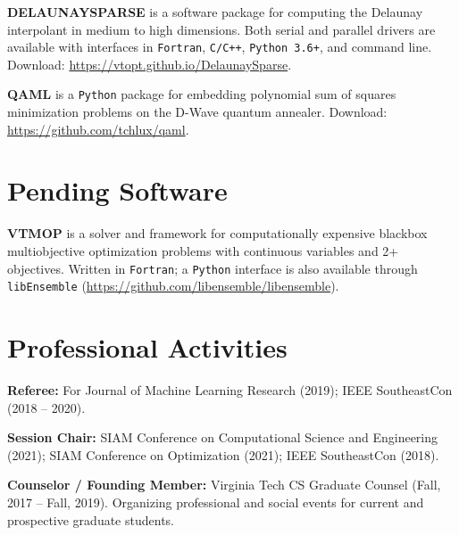 \documentclass[11pt]{article}
\begin{document}
\textbf{DELAUNAYSPARSE} is a software package for computing the Delaunay
interpolant in medium to high dimensions.
Both serial and parallel drivers are available with interfaces in
\texttt{Fortran},
\texttt{C/C++},
\texttt{Python 3.6+},
and command line.
Download: \url{https://vtopt.github.io/DelaunaySparse}.

\textbf{QAML} is a \texttt{Python} package for embedding polynomial sum of
squares minimization problems on the D-Wave quantum annealer.
Download: \url{https://github.com/tchlux/qaml}.

\section*{Pending Software}

\textbf{VTMOP} is a solver and framework for computationally
expensive blackbox multiobjective optimization problems with continuous
variables and 2+ objectives.
Written in \texttt{Fortran}; a \texttt{Python} interface is also available
through \texttt{libEnsemble} (\url{https://github.com/libensemble/libensemble}).


\section*{Professional Activities}

\textbf{Referee:} For
Journal of Machine Learning Research (2019);
IEEE SoutheastCon (2018 -- 2020).

\textbf{Session Chair:}
SIAM Conference on Computational Science and Engineering (2021);
SIAM Conference on Optimization (2021);
IEEE SoutheastCon (2018).

\textbf{Counselor / Founding Member:} Virginia Tech CS Graduate Counsel 
(Fall, 2017 -- Fall, 2019).
Organizing professional and social events for
current and prospective graduate students.
\end{document}
